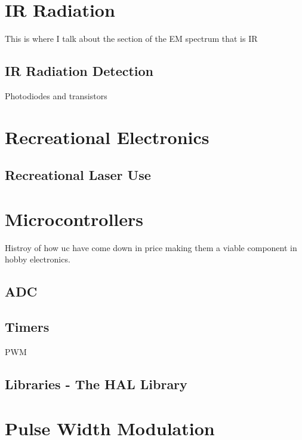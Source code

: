 
\section{IR Radiation}
This is where I talk about the section of the EM spectrum that is IR


\subsection{IR Radiation Detection}

Photodiodes and transistors





\section{Recreational Electronics}


\subsection{Recreational Laser Use}

\section{Microcontrollers}
Histroy of how uc have come down in price making them a viable component in hobby electronics.

\subsection{ADC}

\subsection{Timers}
PWM

\subsection{Libraries - The HAL Library}



\section{Pulse Width Modulation}







